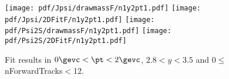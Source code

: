 \begin{figure}[H]
\begin{center}
\texttt{[image: pdf/Jpsi/drawmassF/n1y2pt1.pdf]}
\texttt{[image: pdf/Jpsi/2DFitF/n1y2pt1.pdf]}
\vspace*{-0.5cm}
\texttt{[image: pdf/Psi2S/drawmassF/n1y2pt1.pdf]}
\texttt{[image: pdf/Psi2S/2DFitF/n1y2pt1.pdf]}
\vspace*{-0.5cm}
\end{center}
\caption{Fit results in $0\gevc<\pt<2\gevc$, $2.8<y<3.5$ and 0$\leq$nForwardTracks$<$12.}
\label{Fitn1y2pt1}
\end{figure}

